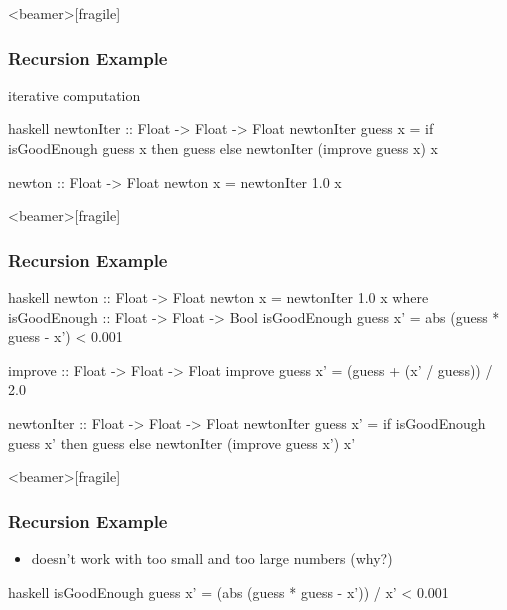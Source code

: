 \documentclass[dvipsnames]{beamer}
\theoremstyle{plain}
\begin{document}
\begin{frame}<beamer>[fragile]
  \frametitle{Recursion Example}

  \begin{exampleblock}{iterative computation}
    \begin{pygments}{haskell}
newtonIter :: Float -> Float -> Float
newtonIter guess x =
    if isGoodEnough guess x
        then guess
        else newtonIter (improve guess x) x

newton :: Float -> Float
newton x = newtonIter 1.0 x
    \end{pygments}
  \end{exampleblock}
\end{frame}

\begin{frame}<beamer>[fragile]
  \frametitle{Recursion Example}

  \begin{exampleblock}{}
    \begin{pygments}{haskell}
newton :: Float -> Float
newton x = newtonIter 1.0 x
  where
    isGoodEnough :: Float -> Float -> Bool
    isGoodEnough guess x' =
        abs (guess * guess - x') < 0.001

    improve :: Float -> Float -> Float
    improve guess x' = (guess + (x' / guess)) / 2.0

    newtonIter :: Float -> Float -> Float
    newtonIter guess x' =
        if isGoodEnough guess x'
            then guess
            else newtonIter (improve guess x') x'
    \end{pygments}
  \end{exampleblock}
\end{frame}

\begin{frame}<beamer>[fragile]
  \frametitle{Recursion Example}

  \begin{exampleblock}{}
    \begin{itemize}
      \item doesn't work with too small and too large numbers (why?)
    \end{itemize}

    \pause
    \smallskip
    \begin{pygments}{haskell}
isGoodEnough guess x' =
    (abs (guess * guess - x')) / x' < 0.001
    \end{pygments}
  \end{exampleblock}
\end{frame}
\end{document}
